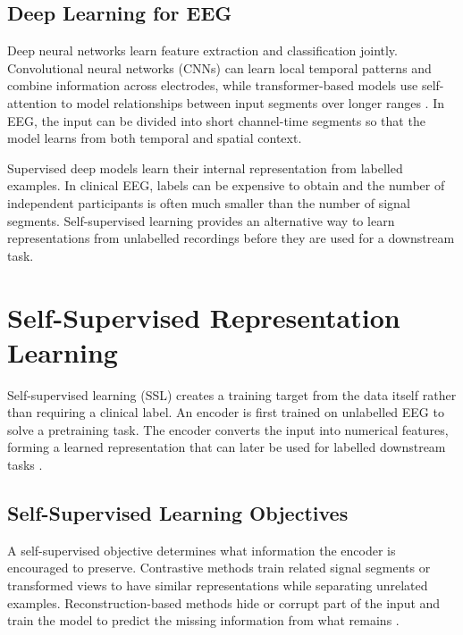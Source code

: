 \subsection{Deep Learning for EEG}\label{sec:bg_deep}

Deep neural networks learn feature extraction and classification jointly. Convolutional neural networks (CNNs) can learn local temporal patterns and combine information across electrodes, while transformer-based models use self-attention to model relationships between input segments over longer ranges \parencite{craikDeepLearningElectroencephalogram2019,songEEGConformerConvolutional2023a}. In EEG, the input can be divided into short channel-time segments so that the model learns from both temporal and spatial context.

Supervised deep models learn their internal representation from labelled examples. In clinical EEG, labels can be expensive to obtain and the number of independent participants is often much smaller than the number of signal segments. Self-supervised learning provides an alternative way to learn representations from unlabelled recordings before they are used for a downstream task.

\section{Self-Supervised Representation Learning}\label{sec:bg_ssl}

Self-supervised learning (SSL) creates a training target from the data itself rather than requiring a clinical label. An encoder is first trained on unlabelled EEG to solve a pretraining task. The encoder converts the input into numerical features, forming a learned representation that can later be used for labelled downstream tasks \parencite{banvilleUncoveringStructureClinical2020,kostasBENDRUsingTransformers2021}.

\subsection{Self-Supervised Learning Objectives}

A self-supervised objective determines what information the encoder is encouraged to preserve. Contrastive methods train related signal segments or transformed views to have similar representations while separating unrelated examples. Reconstruction-based methods hide or corrupt part of the input and train the model to predict the missing information from what remains \parencite{banvilleUncoveringStructureClinical2020,baevskiData2vecGeneralFramework2022}.

